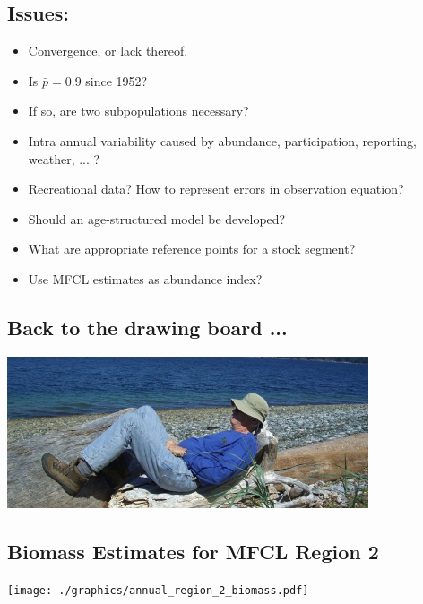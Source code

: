 \documentclass[a4paper,KOMA,landscape,titlepage]{powersem}
\begin{document}
\begin{slide}\section{Issues:}
\begin{itemize}
\item Convergence, or lack thereof.
\item Is $\bar{p} = 0.9$ since 1952?
\item If so, are two subpopulations necessary?
\item Intra annual variability caused by abundance, participation,
reporting, weather, ... ?
\item Recreational data? How to represent errors in observation
equation?
\item Should an age-structured model be developed?
\item What are appropriate reference points for a stock segment?
\item Use MFCL estimates as abundance index?
\end{itemize}
\end{slide}

\begin{slide}\section{Back to the drawing board ...}
\begin{center}
\includegraphics[width=0.8\textwidth]{./graphics/recumbant.png}
\end{center}
\end{slide}



\begin{slide}\section{Biomass Estimates for MFCL Region 2}
\label{fig:MFCL2}
\begin{center}
\texttt{[image: ./graphics/annual\_region\_2\_biomass.pdf]}
\end{center}
\end{slide}
\end{document}
